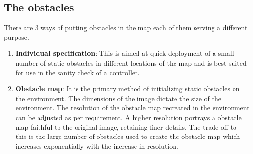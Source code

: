 \subsection{The obstacles}
There are 3 ways of putting obstacles in the map each of them serving a different purpose.
\begin{enumerate}
\item \textbf{Individual specification}: This is aimed at quick deployment of  a small number of static obstacles in different locations of the map and is best suited for use in the sanity check of a controller.
\item \textbf{Obstacle map}: It is the primary method of initializing static obstacles on the environment. The dimensions of the image dictate the size of the environment. The resolution of the obstacle map recreated in the environment can be adjusted as per requirement. A higher resolution portrays a obstacle map faithful to the original image, retaining finer details. The trade off to this is the large number of obstacles used to create the obstacle map which increases exponentially with the increase in resolution.

\end{enumerate}
